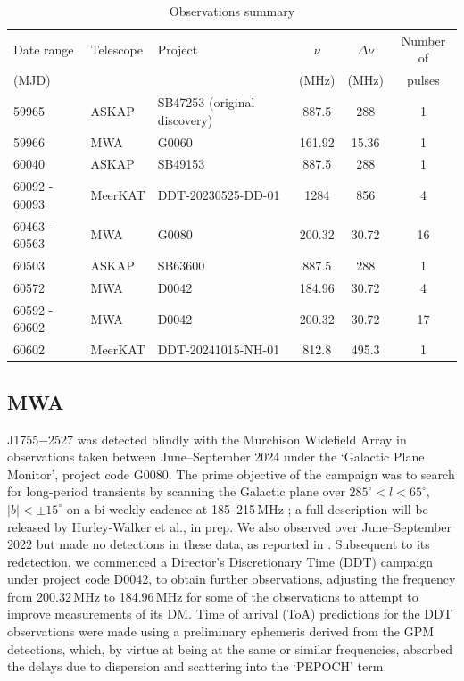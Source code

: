 \documentclass[fleqn,usenatbib]{mnras}
\newcommand{\src}{J1755$-$2527}
\begin{document}
\begin{table}
  \centering
  \caption{Observations summary}
  \label{tbl:obs}
  \begin{tabular}{lllccc}
    \hline
    Date range & Telescope & Project & $\nu$ & $\Delta\nu$ & Number of \\ 
    (MJD) & & & (MHz) & (MHz) & pulses \\
    \hline 
    59965 & ASKAP & SB47253 (original discovery) & 887.5 & 288 & 1 \\
    59966 & MWA & G0060 & 161.92 & 15.36 & 1 \\
    60040  & ASKAP & SB49153 & 887.5 & 288 & 1 \\
    60092 - 60093 & MeerKAT & DDT-20230525-DD-01 & 1284 & 856 & 4 \\
    60463 - 60563 & MWA & G0080 & 200.32 & 30.72 & 16 \\
    60503 & ASKAP & SB63600 & 887.5 & 288 & 1 \\
    60572 & MWA & D0042 & 184.96 & 30.72 & 4 \\
    60592 - 60602 & MWA & D0042 & 200.32 & 30.72 & 17 \\
    60602 & MeerKAT & DDT-20241015-NH-01 & 812.8 & 495.3 & 1 \\
    \hline
  \end{tabular}
\end{table}

\subsection{MWA} \label{sec:mwa}

\src{} was detected blindly with the Murchison Widefield Array \citep[MWA;][]{Tingay2013} in observations taken between June--September 2024 under the `Galactic Plane Monitor', project code G0080. The prime objective of the campaign was to search for long-period transients by scanning the Galactic plane over $285^\circ < l < 65^\circ$, $|b|<\pm15^\circ$ on a bi-weekly cadence at 185--215\,MHz \citep[see Methods of][]{2023Natur.619..487H}; a full description will be released by Hurley-Walker et al., in prep. We also observed over June--September 2022 but made no detections in these data, as reported in .
Subsequent to its redetection, we commenced a Director's Discretionary Time (DDT) campaign under project code D0042, to obtain further observations, adjusting the frequency from 200.32\,MHz to 184.96\,MHz for some of the observations to attempt to improve measurements of its DM.
Time of arrival (ToA) predictions for the DDT observations were made using a preliminary ephemeris derived from the GPM detections, which, by virtue at being at the same or similar frequencies, absorbed the delays due to dispersion and scattering into the `PEPOCH' term.
\end{document}
